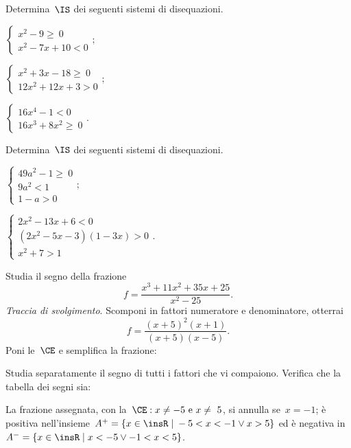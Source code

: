 \begin{esercizio}[\Ast]
 \label{ese:21.52}
 Determina~$\IS$ dei seguenti sistemi di disequazioni.
 \begin{multicols}{3}
 \begin{enumeratea}
 \item $\left\{\begin{array}{l}
		x^{2}-9\ge~0\\
		x^{2}-7x+10<0
	   \end{array}\right.;$
\item $\left\{\begin{array}{l}
		x^{2}+3x-18\ge~0\\
		12x^{2}+12x+3>0
	   \end{array}\right.;$
\item $\left\{\begin{array}{l}
		16x^{4}-1<0 \\
		16x^{3}+8x^{2}\ge~0 \end{array}\right.. $
 \end{enumeratea}
 \end{multicols}
\end{esercizio}

\begin{esercizio}[\Ast]
 \label{ese:21.53}
 Determina~$\IS$ dei seguenti sistemi di disequazioni.
 \begin{multicols}{2}
 \begin{enumeratea}
 \item $\left\{\begin{array}{l}
		49a^{2}-1\ge~0\\
		9a^{2}<1\\
		1-a>0
	   \end{array}\right.;$

\item $\left\{\begin{array}{l}
	  2x^{2}-13x+6<0\\
	  (2x^{2}-5x-3)(1-3x)>0\\
	  x^{2}+7>1
	   \end{array}\right..$
 \end{enumeratea}
 \end{multicols}
\end{esercizio}

\begin{esercizio}
\label{ese:21.54}
Studia il segno della frazione
\[f=\dfrac{x^{3}+11x^{2}+35x+25}{x^{2}-25}.\]
\emph{Traccia di svolgimento}. Scomponi in fattori numeratore e denominatore, otterrai
\[ f=\frac{(x+5)^{2}(x+1)}{(x+5)(x-5)}.\]
Poni le~$\CE$ e semplifica la frazione: \dotfill

Studia separatamente il segno di tutti i fattori che vi compaiono. Verifica che la tabella dei segni sia:
\begin{center}

\end{center}
La frazione assegnata, con la~$\CE: x\neq -5\text{ e }x\neq~5$, si annulla se~$x=-1$;
è positiva nell'insieme~$A^{+}=\left\{x\in \insR\;|\;-5<x<-1\vee x>5\right\}$ ed è negativa in
$A^{-}=\left\{x\in\insR\;|\;x<-5\vee -1<x<5\right\}$.
\end{esercizio}


